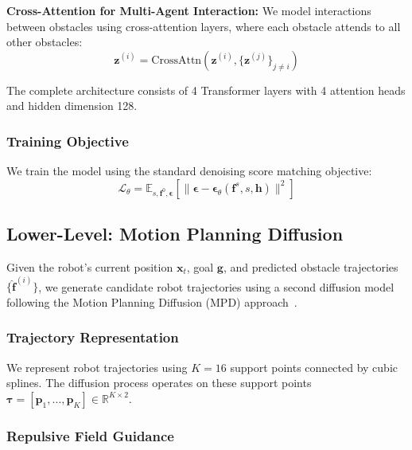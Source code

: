 \documentclass[letterpaper, 10 pt, conference]{ieeeconf}
\begin{document}
\textbf{Cross-Attention for Multi-Agent Interaction:} We model interactions between obstacles using cross-attention layers, where each obstacle attends to all other obstacles:
\begin{equation}
    \mathbf{z}^{(i)} = \text{CrossAttn}(\mathbf{z}^{(i)}, \{\mathbf{z}^{(j)}\}_{j \neq i})
\end{equation}

The complete architecture consists of 4 Transformer layers with 4 attention heads and hidden dimension 128.

\subsubsection{Training Objective}

We train the model using the standard denoising score matching objective:
\begin{equation}
    \mathcal{L}_\theta = \mathbb{E}_{s, \mathbf{f}^0, \boldsymbol{\epsilon}}\left[\|\boldsymbol{\epsilon} - \boldsymbol{\epsilon}_\theta(\mathbf{f}^s, s, \mathbf{h})\|^2\right]
\end{equation}

\subsection{Lower-Level: Motion Planning Diffusion}

Given the robot's current position $\mathbf{x}_t$, goal $\mathbf{g}$, and predicted obstacle trajectories $\{\hat{\mathbf{f}}^{(i)}\}$, we generate candidate robot trajectories using a second diffusion model following the Motion Planning Diffusion (MPD) approach~\cite{carvalho2023motion}.

\subsubsection{Trajectory Representation}

We represent robot trajectories using $K=16$ support points connected by cubic splines. The diffusion process operates on these support points $\boldsymbol{\tau} = [\mathbf{p}_1, \ldots, \mathbf{p}_K] \in \mathbb{R}^{K \times 2}$.

\subsubsection{Repulsive Field Guidance}
\end{document}
